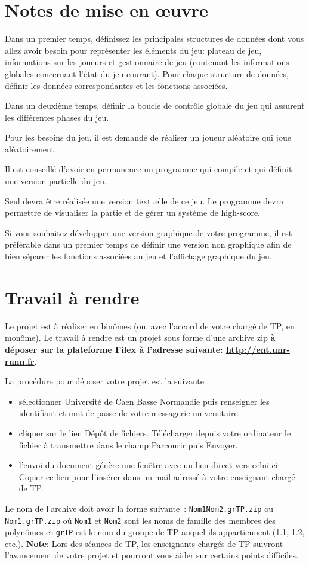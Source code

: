 \documentclass[10pt]{article}
\begin{document}
\section{Notes de mise en {\oe}uvre}

Dans un premier temps, définissez les principales structures de données dont vous allez avoir besoin pour représenter les éléments du jeu: plateau de jeu, informations sur les joueurs et gestionnaire de jeu (contenant les informations globales concernant l'état du jeu courant). Pour chaque structure de données, définir les données correspondantes et les fonctions associées.

Dans un deuxième temps, définir la boucle de contrôle globale du jeu qui assurent les différentes phases du jeu.

Pour les besoins du jeu, il est demandé de réaliser un joueur aléatoire qui joue aléatoirement.

Il est conseillé d'avoir en permanence un programme qui compile et qui définit une version partielle du jeu.

Seul devra être réalisée une version textuelle de ce jeu. Le programme devra permettre de visualiser la partie et de gérer un système de high-score.

Si vous souhaitez développer une version graphique de votre programme, il est préférable dans un premier temps de définir une version non graphique afin de bien séparer les fonctions associées au jeu et l'affichage graphique du jeu.

\section{Travail à rendre}
Le projet est à réaliser en binômes (ou, avec l'accord de votre chargé de TP, en monôme). Le travail à rendre est un projet sous forme d'une archive zip {\bf à déposer sur la plateforme Filex à l'adresse suivante: \url{http://ent.unr-runn.fr}}. 

La procédure pour déposer votre projet est la suivante :
\begin{itemize}
\item sélectionner Université de Caen Basse Normandie puis renseigner les identifiant et mot de passe de votre messagerie universitaire.
\item cliquer sur le lien Dépôt de fichiers. Télécharger depuis votre ordinateur le fichier à transmettre dans le champ Parcourir puis Envoyer. 
\item l'envoi du document génère une fenêtre avec un lien direct vers celui-ci. Copier ce lien pour l'insérer dans un mail adressé à votre enseignant chargé de TP. 
\end{itemize}
\noindent
Le nom de l'archive doit avoir la forme suivante~: \texttt{Nom1Nom2.grTP.zip} ou 
\texttt{Nom1.grTP.zip} où \texttt{Nom1} et \texttt{Nom2} sont les noms de 
famille des membres des polynômes et \texttt{grTP} est le nom du groupe de TP 
auquel ils appartiennent (1.1, 1.2, etc.).
\noindent
{\bf Note}: Lors des séances de TP, les enseignants chargés de TP suivront l'avancement de votre projet et pourront vous aider sur certains points difficiles.
\end{document}
